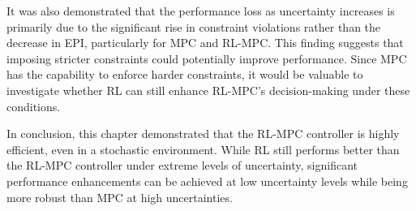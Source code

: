 It was also demonstrated that the performance loss as uncertainty increases is primarily due to the significant rise in constraint violations rather than the decrease in EPI, particularly for MPC and RL-MPC. This finding suggests that imposing stricter constraints could potentially improve performance. Since MPC has the capability to enforce harder constraints, it would be valuable to investigate whether RL can still enhance RL-MPC's decision-making under these conditions.

In conclusion, this chapter demonstrated that the RL-MPC controller is highly efficient, even in a stochastic environment. While RL still performs better than the RL-MPC controller under extreme levels of uncertainty, significant performance enhancements can be achieved at low uncertainty levels while being more robust than MPC at high uncertainties.


